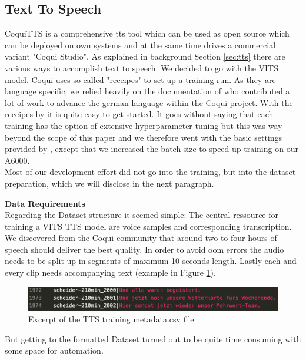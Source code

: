 \documentclass[
  a4paper,  %
  twoside,  %
  bibliography=totoc,
  headsepline,
  cleardoublepage=empty,
  parskip=half,
  draft=false
]{scrbook}
\begin{document}
\subsection{Text To Speech}
CoquiTTS is a comprehensive \gls*{tts} tool which can be used as open source which can be deployed on own systems and at the same time drives a commercial variant "Coqui Studio". As explained in background Section \ref{sec:tts} there are various ways to accomplish text to speech. We decided to go with the VITS model. Coqui uses so called "receipes" to set up a training run. As they are language specific, we relied heavily on the documentation of  who contributed a lot of work to advance the german language within the Coqui project.
With the receipes by  it is quite easy to get started. It goes without saying that each training has the option of extensive hyperparameter tuning but this was way beyond the scope of this paper and we therefore went with the basic settings provided by , except that we increased the batch size to speed up training on our A6000. \\
Most of our development effort did not go into the training, but into the dataset preparation, which we will disclose in the next paragraph.

\textbf{Data Requirements} \\
Regarding the Dataset structure it seemed simple: The central ressource for training a VITS TTS model are voice samples and corresponding transcription. We discovered from the Coqui community that around two to four hours of speech should deliver the best quality. In order to avoid \gls{oom} errors the audio needs to be split up in segments of maximum 10 seconds length. Lastly each and every clip needs accompanying text (example in Figure \ref{fig:metadata.csv}).
\begin{figure}[h]
  \centering
  \includegraphics[width=1\textwidth]{./graphics/images/tts/csv.png}
  \caption{Excerpt of the TTS training metadata.csv file}
  \label{fig:metadata.csv}
\end{figure}
But getting to the formatted Dataset turned out to be quite time consuming with some space for automation.
\end{document}
